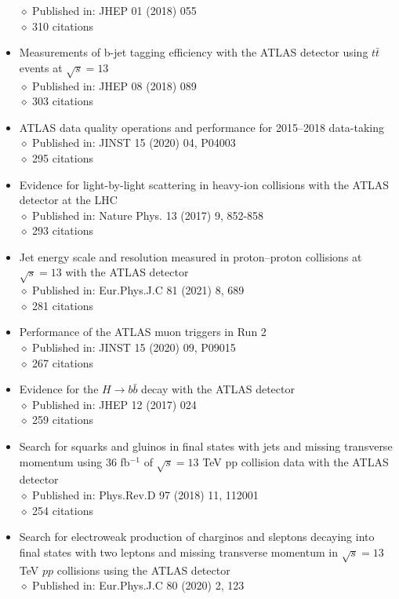 \documentclass[margin, 10pt]{res} %
\begin{document}
\begin{resume}
\begin{itemize}
$\diamond$ Published in: JHEP 01 (2018) 055\\
$\diamond$ 310 citations
\item Measurements of b-jet tagging efficiency with the ATLAS detector using $t\bar{t}$ events at $\sqrt{s} = 13$\\
$\diamond$ Published in: JHEP 08 (2018) 089\\
$\diamond$ 303 citations
\item ATLAS data quality operations and performance for 2015–2018 data-taking\\
$\diamond$ Published in: JINST 15 (2020) 04, P04003\\
$\diamond$ 295 citations
\item Evidence for light-by-light scattering in heavy-ion collisions with the ATLAS detector at the LHC\\
$\diamond$ Published in: Nature Phys. 13 (2017) 9, 852-858\\
$\diamond$ 293 citations
\item Jet energy scale and resolution measured in proton–proton collisions at $\sqrt{s} = 13$ with the ATLAS detector\\
$\diamond$ Published in: Eur.Phys.J.C 81 (2021) 8, 689\\
$\diamond$ 281 citations
\item Performance of the ATLAS muon triggers in Run 2\\
$\diamond$ Published in: JINST 15 (2020) 09, P09015\\
$\diamond$ 267 citations
\item Evidence for the $H \rightarrow b\bar{b}$ decay with the ATLAS detector\\
$\diamond$ Published in: JHEP 12 (2017) 024\\
$\diamond$ 259 citations
\item Search for squarks and gluinos in final states with jets and missing transverse momentum using 36 fb$^{-1}$ of $\sqrt{s} = 13$ TeV pp collision data with the ATLAS detector\\
$\diamond$ Published in: Phys.Rev.D 97 (2018) 11, 112001\\
$\diamond$ 254 citations
\item Search for electroweak production of charginos and sleptons decaying into final states with two leptons and missing transverse momentum in $\sqrt{s} = 13$ TeV $pp$ collisions using the ATLAS detector\\
$\diamond$ Published in: Eur.Phys.J.C 80 (2020) 2, 123\\

\end{itemize}
\end{resume}
\end{document}
